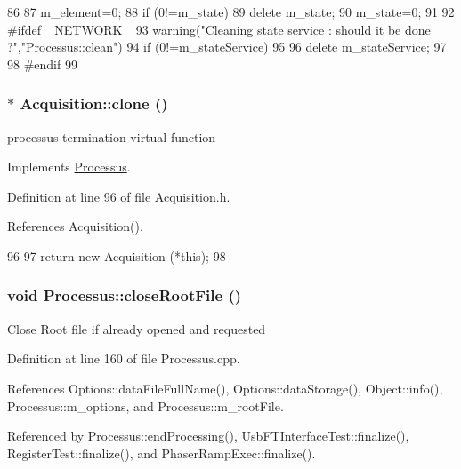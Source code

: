 \begin{DoxyCode}
86   {
87     m_element=0;
88     if (0!=m_state) {
89       delete m_state;
90       m_state=0;
91     }
92 #ifdef _NETWORK_
93     warning("Cleaning state service : should it be done ?","Processus::clean")
94       if (0!=m_stateService)
95       {
96         delete m_stateService;
97       }
98 #endif
99   }
\end{DoxyCode}
\hypertarget{classAcquisition_a4b1b690ef27f20b3e1ad9383f2f57628}{
\subsubsection[{clone}]{$\ast$ Acquisition::clone ()}}
\label{classAcquisition_a4b1b690ef27f20b3e1ad9383f2f57628}
processus termination virtual function 

Implements \hyperlink{classProcessus_aca8856f6d6d7b7e1fe941f298dcbb502}{Processus}.

Definition at line 96 of file Acquisition.h.

References Acquisition().


\begin{DoxyCode}
96                       {
97     return new Acquisition (*this);
98   }
\end{DoxyCode}
\hypertarget{classProcessus_a2f3c41e99da4c738ea3d8f7b0d20a665}{
\subsubsection[{closeRootFile}]{\setlength{\rightskip}{0pt plus 5cm}void Processus::closeRootFile ()}}
\label{classProcessus_a2f3c41e99da4c738ea3d8f7b0d20a665}
Close Root file if already opened and requested 

Definition at line 160 of file Processus.cpp.

References Options::dataFileFullName(), Options::dataStorage(), Object::info(), Processus::m\_\-options, and Processus::m\_\-rootFile.

Referenced by Processus::endProcessing(), UsbFTInterfaceTest::finalize(), RegisterTest::finalize(), and PhaserRampExec::finalize().


